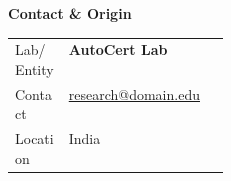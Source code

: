 \documentclass[a4paper,landscape,10pt]{article}
\newcommand{\sectitle}[1]{
    \vspace{0.4cm}
    \colorbox{rowcolor}{
        \parbox{\linewidth}{
            \textbf{\textcolor{maincolor}{#1}}
        }
    }
    \vspace{0.2cm}
}
\begin{document}
\begin{multicols}{3}
\sectitle{Contact \& Origin}

\colorbox{rowcolor}{
\parbox{\linewidth}{
\begin{tabularx}{\linewidth}{>{\raggedright\arraybackslash}p{0.25\linewidth} X}
Lab/Entity & \textbf{AutoCert Lab} \\
Contact & \href{mailto:research@domain.edu}{research@domain.edu} \\
Location & India\\
\end{tabularx}
}
}

\vfill\null
\end{multicols}
\end{document}
